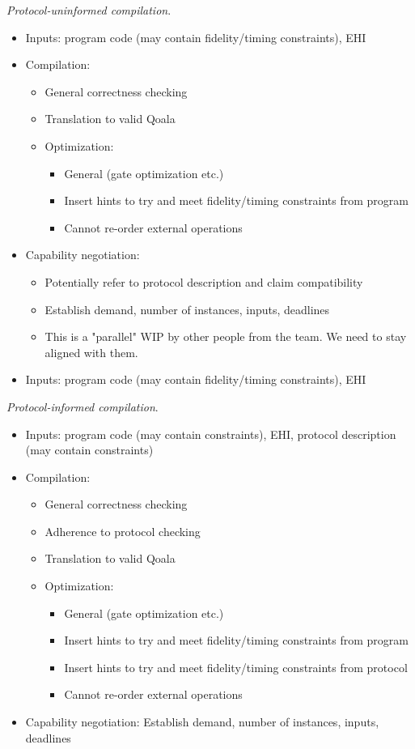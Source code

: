 \textit{Protocol-uninformed compilation}.
\begin{itemize}
\item Inputs: program code (may contain fidelity/timing constraints), EHI
\item Compilation:
    \begin{itemize}
        \item General correctness checking
        \item Translation to valid Qoala
        \item Optimization:
            \begin{itemize}
                \item General (gate optimization etc.)
                \item Insert hints to try and meet fidelity/timing constraints from program
                \item Cannot re-order external operations
        \end{itemize}
    \end{itemize}
\item Capability negotiation:
    \begin{itemize}
        \item Potentially refer to protocol description and claim compatibility
        \item Establish demand, number of instances, inputs, deadlines
        \item This is a "parallel" WIP by other people from the team. We need to stay aligned with them.
    \end{itemize}
\item Inputs: program code (may contain fidelity/timing constraints), EHI
\end{itemize}

\textit{Protocol-informed compilation}.
\begin{itemize}
    \item Inputs: program code (may contain constraints), EHI, protocol description (may contain constraints)
    \item Compilation:
    \begin{itemize}
        \item General correctness checking
        \item Adherence to protocol checking
        \item Translation to valid Qoala
        \item Optimization:
        \begin{itemize}
            \item General (gate optimization etc.)
            \item Insert hints to try and meet fidelity/timing constraints from program
            \item Insert hints to try and meet fidelity/timing constraints from protocol
            \item Cannot re-order external operations
        \end{itemize}
    \end{itemize}
    \item Capability negotiation: Establish demand, number of instances, inputs, deadlines
\end{itemize}

